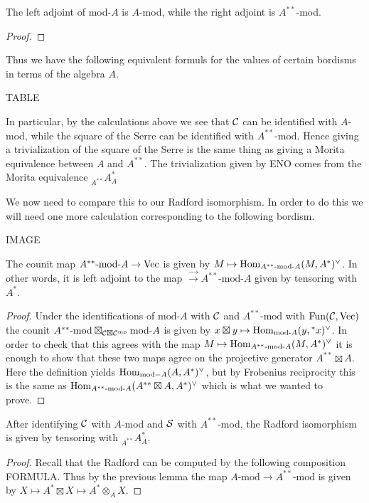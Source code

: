\documentclass{amsart}
\begin{document}
\begin{lemma}
The left adjoint of mod-$A$ is $A$-mod, while the right adjoint is $A^{**}$-mod.
\end{lemma}
\begin{proof}
\end{proof}

Thus we have the following equivalent formuls for the values of certain bordisms in terms of the algebra $A$.

TABLE

In particular, by the calculations above we see that $\cC$ can be identified with $A$-mod, while the square of the Serre can be identified with $A^{**}$-mod.  Hence giving a trivialization of the square of the Serre is the same thing as giving a Morita equivalence between $A$ and $A^{**}$.  The trivialization given by ENO comes from the Morita equivalence ${}_{A^{**}} A^*_{A}$

We now need to compare this to our Radford isomorphism.  In order to do this we will need one more calculation corresponding to the following bordism.

IMAGE

\begin{lemma}
The counit map $A^{**}\text{-mod-}A \rightarrow \Vec$ is given by $M \mapsto \Hom_{A^{**}\text{-mod-}A}(M, A^*)^\vee$.  In other words, it is left adjoint to the map $\Vec \rightarrow A^{**}\text{-mod-}A$ given by tensoring with $A^*$.
\end{lemma}
\begin{proof}
Under the identifications of $\text{mod-}A$ with $\cC$ and $A^{**}\text{-mod}$ with $\Fun(\cC, \Vec)$ the counit $A^{**}\text{-mod} \boxtimes_{\cC \boxtimes \cC^\mp} \text{mod-}A$ is given by $x \boxtimes y \mapsto \Hom_{\text{mod-}A}(y, {}^*x)^\vee$.  In order to check that this agrees with the map $M \mapsto \Hom_{A^{**}\text{-mod-}A}(M, A^*)^\vee$ it is enough to show that these two maps agree on the projective generator $A^{**} \boxtimes A$.  Here the definition yields $\Hom_{\text{mod}-A}(A, A^*)^\vee$, but by Frobenius reciprocity this is the same as $\Hom_{A^{**}\text{-mod-}A}(A^{**} \boxtimes A, A^*)^\vee$ which is what we wanted to prove.
\end{proof}


\begin{lemma}
After identifying $\cC$ with $A$-mod and $\cS$ with $A^{**}$-mod, the Radford isomorphism is given by tensoring with ${}_{A^{**}} A^*_{A}$.
\end{lemma}
\begin{proof}
Recall that the Radford can be computed by the following composition FORMULA.  Thus by the previous lemma the map $A\text{-mod} \rightarrow A^{**}\text{-mod}$ is given by $X \mapsto A^* \boxtimes X \mapsto A^* \otimes_A X$.
\end{proof}
\end{document}
